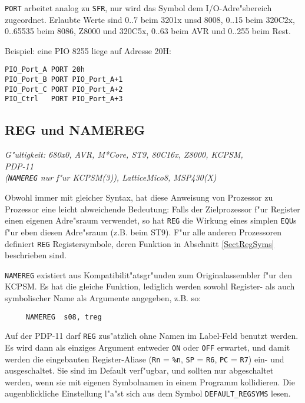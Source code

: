 \documentclass[12pt,a4paper,twoside]{report}
\makeatletter
\newcommand{\tty}[1]{{\tt #1}}
\newcommand{\ttindex}[1]{\index{#1@{\tt #1}}}
\makeatother
\begin{document}
\tty{PORT} arbeitet analog zu \tty{SFR}, nur wird das Symbol dem I/O-Adre"sbereich
zugeordnet.  Erlaubte Werte sind 0..7 beim 3201x unsd 8008, 0..15 beim 320C2x,
0..65535 beim 8086, Z8000 und 320C5x, 0..63 beim AVR und 0..255 beim Rest.
\par
Beispiel: eine PIO 8255 liege auf Adresse 20H:
\begin{verbatim}
PIO_Port_A PORT 20h
PIO_Port_B PORT PIO_Port_A+1
PIO_Port_C PORT PIO_Port_A+2
PIO_Ctrl   PORT PIO_Port_A+3
\end{verbatim}


\subsection{REG und NAMEREG}
\ttindex{REG}\ttindex{NAMEREG}

{\em G"ultigkeit: 680x0, AVR, M*Core, ST9, 80C16x, Z8000, KCPSM, \\
     PDP-11 \\
     (\tty{NAMEREG} nur f"ur KCPSM(3)), LatticeMico8, MSP430(X)}

Obwohl immer mit gleicher Syntax, hat diese Anweisung von Prozessor
zu Prozessor eine leicht abweichende Bedeutung: Falls der Zielprozessor
f"ur Register einen eigenen Adre"sraum verwendet, so hat \tty{REG}
die Wirkung eines simplen \tty{EQU}s f"ur eben diesen Adre"sraum (z.B. beim
ST9).  F"ur alle anderen Prozessoren definiert \tty{REG} Registersymbole,
deren Funktion in Abschnitt \ref{SectRegSyms} beschrieben sind.

{\tt NAMEREG} existiert aus Kompatibilit"atsgr"unden zum Originalassembler
f"ur den KCPSM.  Es hat die gleiche Funktion, lediglich werden sowohl
Register- als auch symbolischer Name als Argumente angegeben, z.B. so:
\begin{verbatim}
     NAMEREG  s08, treg
\end{verbatim}

Auf der PDP-11 darf \tty{REG} zus"atzlich ohne Namen im Label-Feld benutzt
werden.  Es wird dann als einziges Argument entweder \tty{ON} oder \tty{OFF}
erwartet, und damit werden die eingebauten Register-Aliase (\tty{Rn} = \tty{\%n},
\tty{SP} = \tty{R6}, \tty{PC} = \tty{R7}) ein- und ausgeschaltet.  Sie
sind im Default verf"ugbar, und sollten nur abgeschaltet werden, wenn
sie mit eigenen Symbolnamen in einem Programm kollidieren.  Die augenblickliche
Einstellung l"a"st sich aus dem Symbol \tty{DEFAULT\_REGSYMS} lesen.
\end{document}
